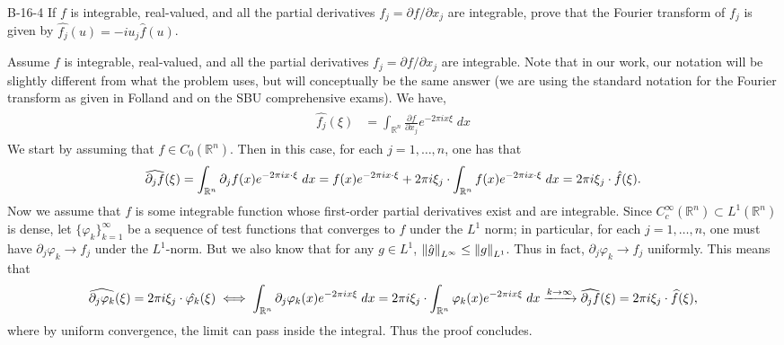 \documentclass{article}
\begin{document}
	\begin{prb}{B-16-4}
		If $f$ is integrable, real-valued, and all the partial derivatives $f_j = \partial f/\partial x_j$ are integrable, prove that the Fourier transform of $f_j$ is given by $\hat{f_{j}}(u) = -iu_j\hat{f}(u)$. 
	\end{prb}
	Assume $f$ is integrable, real-valued, and all the partial derivatives $f_j = \partial f/\partial x_j$ are integrable. Note that in our work, our notation will be slightly different from what the problem uses, but will conceptually be the same answer (we are using the standard notation for the Fourier transform as given in Folland and on the SBU comprehensive exams). We have, 
	\begin{align*}
		\begin{split}
			\hat{f_{j}}(\xi) &= \int_{\mathbb{R}^{n}}\frac{\partial f}{\partial x_{j}}e^{-2\pi i x \xi}\;dx 
		\end{split}
	\end{align*}
	We start by assuming that $f \in C_{0}(\mathbb{R}^{n})$. Then in this case, for each $j = 1,\ldots, n$, one has that 
	\begin{equation*}
		\widehat{\partial_{j}f}(\xi) = \int_{\mathbb{R}^{n}}\partial_{j}f(x)e^{-2\pi i x \cdot \xi}\;dx = f(x)e^{-2\pi i x \cdot \xi} + 2\pi i \xi_{j} \cdot \int_{\mathbb{R}^{n}} f(x)e^{-2\pi i x \cdot \xi}\;dx = 2\pi i \xi_{j} \cdot \hat{f}(\xi). 
	\end{equation*}
	Now we assume that $f$ is some integrable function whose first-order partial derivatives exist and are integrable. Since $C_{c}^{\infty}(\mathbb{R}^{n}) \subset L^1(\mathbb{R}^{n})$ is dense, let $\{\varphi_{k}\}_{k = 1}^{\infty}$ be a sequence of test functions that converges to $f$ under the $L^1$ norm; in particular, for each $j = 1, \ldots,n$, one must have $\partial_{j}\varphi_{k} \to f_{j}$ under the $L^1$-norm. But we also know that for any $g \in L^1$, $\left\Vert \hat{g} \right\Vert_{L^\infty} \leq \left\Vert g \right\Vert_{L^1}$. Thus in fact, $\partial_{j}\varphi_{k} \to f_{j}$ uniformly. This means that 
	\begin{equation*}
		\widehat{\partial_{j}\varphi_{k}}(\xi) = 2\pi i \xi_{j} \cdot \hat{\varphi_{k}}(\xi) \iff \int_{\mathbb{R}^{n}}\partial_{j}\varphi_{k}(x)e^{-2\pi i x \xi}\;dx = 2\pi i \xi_{j}  \cdot \int_{\mathbb{R}^{n}}\varphi_{k}(x)e^{-2\pi i x \xi}\;dx \xrightarrow{k \to \infty} \widehat{\partial_{j}f}(\xi) = 2\pi i \xi_{j} \cdot \widehat{f}(\xi), 
	\end{equation*}
	where by uniform convergence, the limit can pass inside the integral. Thus the proof concludes. 
	
\end{document}
